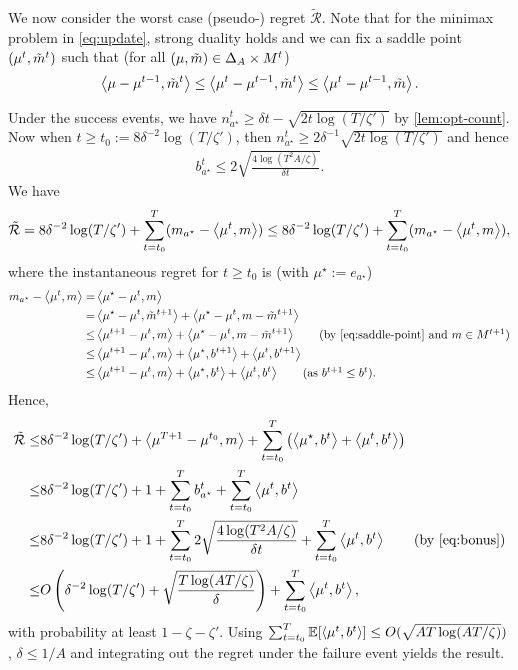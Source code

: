 \noindent  We now consider the worst case (pseudo-) regret $\tilde{\mathcal{R}}$. Note that for the minimax problem in \cref{eq:update}, strong duality holds and we can fix a saddle point $(\mu^t, \tilde{m}^t)$ such that (for all $(\mu,\tilde{m}) \in \Delta_A\times M^t$)
\begin{align}
    \left\langle \mu-\mu^{t-1}, \tilde{m}^t \right\rangle \leq \left\langle \mu^t-\mu^{t-1}, \tilde{m}^t \right\rangle \leq \left\langle \mu^t-\mu^{t-1}, \tilde{m} \right\rangle. \label{eq:saddle-point}
\end{align}

\noindent Under the success events, we have $n_{a^\star}^t \geq \delta t - \sqrt{ 2t \log(T/\zeta') }$ by \cref{lem:opt-count}. Now when $t \geq t_0 := 8\delta^{-2} \log(T/\zeta')$, then $n_{a^\star}^t \geq 2\delta^{-1}\sqrt{ 2t \log(T/\zeta') }$ and hence 
\begin{align}
    b_{a^\star}^t \leq 2\sqrt{\frac{4\log(T^2A/\zeta)}{\delta t}}. \label{eq:bonus}
\end{align}
We have 
\begin{align*}
    \tilde{\mathcal{R}} =  8\delta^{-2} \log(T/\zeta') + \sum_{t=t_0}^T (m_{a^\star} - \left\langle \mu^{t}, m \right\rangle) \leq 8\delta^{-2} \log(T/\zeta') + \sum_{t=t_0}^T (m_{a^\star} - \left\langle \mu^{t}, m \right\rangle),
    \end{align*}
where the instantaneous regret for $t\geq t_0$ is (with $\mu^\star:=e_{a^\star}$)
\begin{align*}
    \mean_{a^\star} - \inner{\mu^{t}}{\mean} =& \inner{\mu^\star - \mu^{t}}{\mean}\\
    =& \inner{\mu^\star - \mu^{t}}{\meanTilde^{t+1}} + \inner{\mu^\star - \mu^{t}}{\mean - \meanTilde^{t+1}} \\
    \leq& \inner{\mu^{t+1} - \mu^{t}}{\mean} + \inner{\mu^\star - \mu^{t}}{\mean - \meanTilde^{t+1}} \tag{by \cref{eq:saddle-point} and $\mean\in M^{t+1}$}\\
    \leq& \inner{\mu^{t+1} - \mu^{t}}{\mean} + \inner{\mu^\star}{b^{t+1}} + \inner{\mu^t}{b^{t+1}}\\
    \leq& \inner{\mu^{t+1} - \mu^{t}}{\mean} + \inner{\mu^\star}{b^{t}} + \inner{\mu^t}{b^{t}} \tag{as $b^{t+1}\leq b^t$}.
\end{align*}
Hence,
\begin{align*}
    \tilde{\mathcal{R}} \leq& 8\delta^{-2} \log(T/\zeta') + \inner{\mu^{T+1} - \mu^{t_0}}{\mean} + \sum_{t=t_0}^T \round{\inner{\mu^\star}{b^{t}} + \inner{\mu^t}{b^{t}}}\\
    \leq& 8\delta^{-2} \log(T/\zeta') + 1 + \sum_{t=t_0}^T b_{a^\star}^{t} + \sum_{t=t_0}^T \inner{\mu^t}{b^{t}}\\
    \leq& 8\delta^{-2} \log(T/\zeta') + 1 + \sum_{t=t_0}^T 2\sqrt{\frac{4\log(T^2A/\zeta)}{\delta t}} + \sum_{t=t_0}^T \inner{\mu^t}{b^{t}} \tag{by \cref{eq:bonus}}\\
    \leq& O\round{\delta^{-2} \log(T/\zeta') + \sqrt{\frac{T\log(AT/\zeta)}{\delta}}} + \sum_{t=t_0}^T \inner{\mu^t}{b^{t}},
\end{align*}
with probability at least $1-\zeta-\zeta'$. Using $\sum_{t=t_0}^T \mathbb{E}[\left\langle \mu^t, b^{t} \right\rangle] \leq O( \sqrt{AT\log(AT/\zeta)} )$ \citep{auer2008near}, $\delta\leq1/A$ and integrating out the regret under the failure event yields the result.